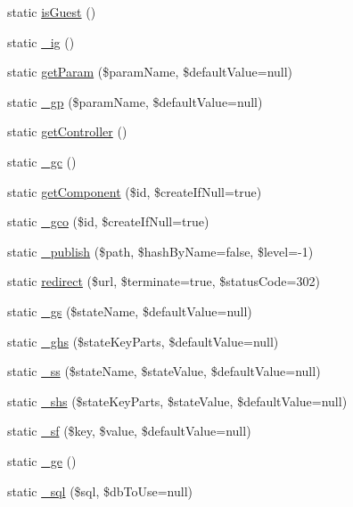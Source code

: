 \begin{DoxyCompactItemize}
static \hyperlink{classCPSHelperBase_a3d6c9ff1005fcc403d30d5dd8ef70210}{isGuest} ()
\item 
static \hyperlink{classCPSHelperBase_aed6576cf2c433f4b9e680837077ca24a}{\_\-ig} ()
\item 
static \hyperlink{classCPSHelperBase_a087197354f5d5ea44dba55e299ea7cf1}{getParam} (\$paramName, \$defaultValue=null)
\item 
static \hyperlink{classCPSHelperBase_ac7c3e1de6ec0f5f1b7dab860f0f41b45}{\_\-gp} (\$paramName, \$defaultValue=null)
\item 
static \hyperlink{classCPSHelperBase_a0c5216068060ca9253dbad31e5895a2b}{getController} ()
\item 
static \hyperlink{classCPSHelperBase_acfa125cb8763a233249680de9fb3e15a}{\_\-gc} ()
\item 
static \hyperlink{classCPSHelperBase_a83dcef935baa0a3531789c502041561f}{getComponent} (\$id, \$createIfNull=true)
\item 
static \hyperlink{classCPSHelperBase_af931bb2b4edcc29e082528f133f7a62f}{\_\-gco} (\$id, \$createIfNull=true)
\item 
static \hyperlink{classCPSHelperBase_a9996657204b3496d9ef5709d50b517f0}{\_\-publish} (\$path, \$hashByName=false, \$level=-\/1)
\item 
static \hyperlink{classCPSHelperBase_a6a6d3a3befedda9eb08700b7f51dd4e5}{redirect} (\$url, \$terminate=true, \$statusCode=302)
\item 
static \hyperlink{classCPSHelperBase_adeaa7024db6a25cc45abc37c388661d3}{\_\-gs} (\$stateName, \$defaultValue=null)
\item 
static \hyperlink{classCPSHelperBase_ac605603031e05d1ec69ce6c1bb23cf24}{\_\-ghs} (\$stateKeyParts, \$defaultValue=null)
\item 
static \hyperlink{classCPSHelperBase_aa5c4459afda5a8a58c46a26aecafaf37}{\_\-ss} (\$stateName, \$stateValue, \$defaultValue=null)
\item 
static \hyperlink{classCPSHelperBase_a891a2db3b73ee6c336384be49b163932}{\_\-shs} (\$stateKeyParts, \$stateValue, \$defaultValue=null)
\item 
static \hyperlink{classCPSHelperBase_ac2bdee30f3e1ff39d01e094d6c6c311e}{\_\-sf} (\$key, \$value, \$defaultValue=null)
\item 
static \hyperlink{classCPSHelperBase_aadc4f61a58cb31fe918a67c67d9646c7}{\_\-ge} ()
\item 
static \hyperlink{classCPSHelperBase_a539756575c5f36371f4267d89eb443f7}{\_\-sql} (\$sql, \$dbToUse=null)

\end{DoxyCompactItemize}
